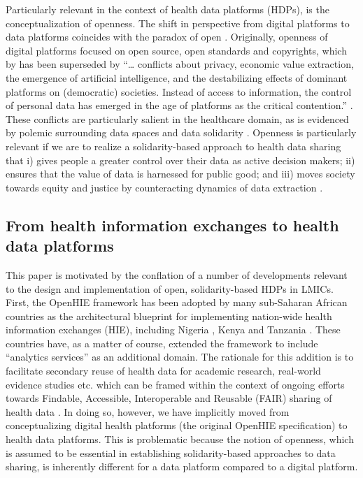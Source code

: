 \documentclass[
  authoryear]{elsarticle}
\begin{document}
Particularly relevant in the context of health data platforms (HDPs), is
the conceptualization of openness. The shift in perspective from digital
platforms to data platforms coincides with the paradox of open
\citep{keller2021paradox}. Originally, openness of digital platforms
focused on open source, open standards and copyrights, which by has been
superseded by ``\ldots{} conflicts about privacy, economic value
extraction, the emergence of artificial intelligence, and the
destabilizing effects of dominant platforms on (democratic) societies.
Instead of access to information, the control of personal data has
emerged in the age of platforms as the critical contention.''
\citep{keller2021paradox}. These conflicts are particularly salient in
the healthcare domain, as is evidenced by polemic surrounding data
spaces \citep{otto2022designing} and data solidarity
\citep{kickbusch2021lancet, prainsack2022data, prainsack2023beyond}.
Openness is particularly relevant if we are to realize a
solidarity-based approach to health data sharing that i) gives people a
greater control over their data as active decision makers; ii) ensures
that the value of data is harnessed for public good; and iii) moves
society towards equity and justice by counteracting dynamics of data
extraction \citep{prainsack2022data}.

\subsection{From health information exchanges to health data
platforms}\label{from-health-information-exchanges-to-health-data-platforms}

This paper is motivated by the conflation of a number of developments
relevant to the design and implementation of open, solidarity-based HDPs
in LMICs. First, the OpenHIE framework \citep{openhie} has been adopted
by many sub-Saharan African countries \citep{mamuye2022health} as the
architectural blueprint for implementing nation-wide health information
exchanges (HIE), including Nigeria \citep{dalhatu2023paper}, Kenya
\citep{thaiya2021adoption} and Tanzania \citep{nsaghurwe2021one}. These
countries have, as a matter of course, extended the framework to include
``analytics services'' as an additional domain. The rationale for this
addition is to facilitate secondary reuse of health data for academic
research, real-world evidence studies etc. which can be framed within
the context of ongoing efforts towards Findable, Accessible,
Interoperable and Reusable (FAIR) sharing of health data
\citep{guillot2023fair}. In doing so, however, we have implicitly moved
from conceptualizing digital health platforms (the original OpenHIE
specification) to health data platforms. This is problematic because the
notion of openness, which is assumed to be essential in establishing
solidarity-based approaches to data sharing, is inherently different for
a data platform compared to a digital platform.
\end{document}
